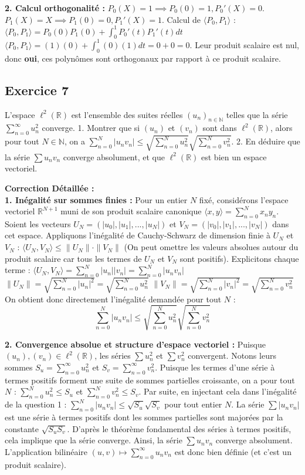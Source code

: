 \documentclass[11pt,a4paper]{report}
\begin{document}
\textbf{2. Calcul orthogonalité :}
$P_0(X) = 1 \implies P_0(0) = 1, P_0'(X) = 0$.
$P_1(X) = X \implies P_1(0) = 0, P_1'(X) = 1$.
Calcul de $\langle P_0, P_1 \rangle$ :
$\langle P_0, P_1 \rangle = P_0(0)P_1(0) + \int_0^1 P_0'(t)P_1'(t) dt$
$\langle P_0, P_1 \rangle = (1)(0) + \int_0^1 (0)(1) dt = 0 + 0 = 0$.
Leur produit scalaire est nul, donc \textbf{oui}, ces polynômes sont orthogonaux par rapport à ce produit scalaire.

\subsection*{Exercice 7}

L'espace $\ell^2(\mathbb{R})$ est l'ensemble des suites réelles $(u_n)_{n \in \mathbb{N}}$ telles que la série $\sum_{n=0}^\infty u_n^2$ converge.
1. Montrer que si $(u_n)$ et $(v_n)$ sont dans $\ell^2(\mathbb{R})$, alors pour tout $N \in \mathbb{N}$, on a $\sum_{n=0}^N |u_n v_n| \le \sqrt{\sum_{n=0}^N u_n^2} \sqrt{\sum_{n=0}^N v_n^2}$.
2. En déduire que la série $\sum u_n v_n$ converge absolument, et que $\ell^2(\mathbb{R})$ est bien un espace vectoriel.

\textbf{Correction Détaillée :}\\ \textbf{1. Inégalité sur sommes finies :}
Pour un entier $N$ fixé, considérons l'espace vectoriel $\mathbb{R}^{N+1}$ muni de son produit scalaire canonique $\langle x, y \rangle = \sum_{n=0}^N x_n y_n$.
Soient les vecteurs $U_N = (|u_0|, |u_1|, ..., |u_N|)$ et $V_N = (|v_0|, |v_1|, ..., |v_N|)$ dans cet espace.
Appliquons l'inégalité de Cauchy-Schwarz de dimension finie à $U_N$ et $V_N$ :
$\langle U_N, V_N \rangle \le \|U_N\| \cdot \|V_N\|$
(On peut omettre les valeurs absolues autour du produit scalaire car tous les termes de $U_N$ et $V_N$ sont positifs).
Explicitons chaque terme :
$\langle U_N, V_N \rangle = \sum_{n=0}^N |u_n| |v_n| = \sum_{n=0}^N |u_n v_n|$
$\|U_N\| = \sqrt{\sum_{n=0}^N |u_n|^2} = \sqrt{\sum_{n=0}^N u_n^2}$
$\|V_N\| = \sqrt{\sum_{n=0}^N |v_n|^2} = \sqrt{\sum_{n=0}^N v_n^2}$
On obtient donc directement l'inégalité demandée pour tout $N$ :
$$\sum_{n=0}^N |u_n v_n| \le \sqrt{\sum_{n=0}^N u_n^2} \sqrt{\sum_{n=0}^N v_n^2}$$

\textbf{2. Convergence absolue et structure d'espace vectoriel :}
Puisque $(u_n), (v_n) \in \ell^2(\mathbb{R})$, les séries $\sum u_n^2$ et $\sum v_n^2$ convergent.
Notons leurs sommes $S_u = \sum_{n=0}^\infty u_n^2$ et $S_v = \sum_{n=0}^\infty v_n^2$.
Puisque les termes d'une série à termes positifs forment une suite de sommes partielles croissante, on a pour tout $N$ :
$\sum_{n=0}^N u_n^2 \le S_u$ et $\sum_{n=0}^N v_n^2 \le S_v$.
Par suite, en injectant cela dans l'inégalité de la question 1 :
$\sum_{n=0}^N |u_n v_n| \le \sqrt{S_u} \sqrt{S_v}$ pour tout entier $N$.
La série $\sum |u_n v_n|$ est une série à termes positifs dont les sommes partielles sont majorées par la constante $\sqrt{S_u S_v}$.
D'après le théorème fondamental des séries à termes positifs, cela implique que la série converge.
Ainsi, la série $\sum u_n v_n$ converge absolument. L'application bilinéaire $(u, v) \mapsto \sum_{n=0}^\infty u_n v_n$ est donc bien définie (et c'est un produit scalaire).
\end{document}
